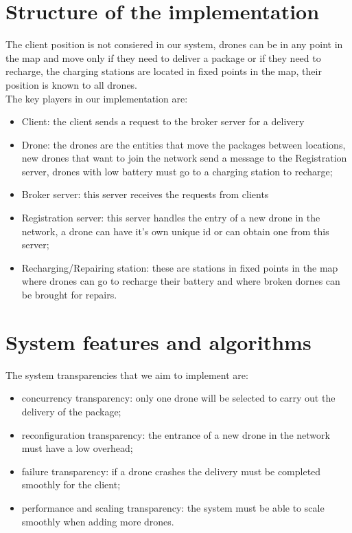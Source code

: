 \documentclass[a4paper, oneside]{memoir}
\begin{document}
\section{Structure of the implementation}

The client position is not consiered in our system, drones can be in any point in the map and move only if they need to deliver a package or if they need to recharge, the charging stations are located in fixed points in the map, their position is known to all drones.
\\
The key players in our implementation are:
\begin{itemize}
\item Client: the client sends a request to the broker server for a delivery %
\item Drone: the drones are the entities that move the packages between locations, new drones that want to join the network send a message to the Registration server, drones with low battery must go to a charging station to recharge;
\item Broker server: this server receives the requests from clients %
\item Registration server: this server handles the entry of a new drone in the network, a drone can have it's own unique id or can obtain one from this server;
\item Recharging/Repairing station: these are stations in fixed points in the map where drones can go to recharge their battery and where broken dornes can be brought for repairs.
\end{itemize}


\section{System features and algorithms}



The system transparencies that we aim to implement are:
\begin{itemize}
	\item concurrency transparency: only one drone will be selected to carry out the delivery of the package;
	\item reconfiguration transparency: the entrance of a new drone in the network must have a low overhead;
	\item failure transparency: if a drone crashes the delivery must be completed smoothly for the client;
	\item performance and scaling transparency: the system must be able to scale smoothly when adding more drones.
\end{itemize}
\end{document}
